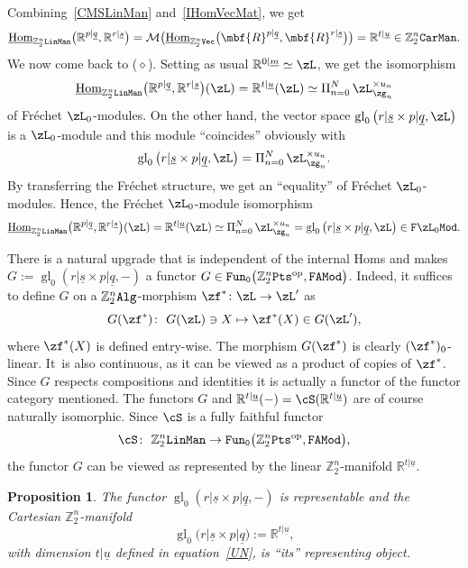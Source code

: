 \documentclass[10pt,a4paper]{amsart}
\newcommand{\op}[1]{\operatorname{#1}}
\newcommand{\R}{{\mathbb R}}
\newcommand{\Z}{{\mathbb Z}}
\def\ul{\underline}
\def\cM{\cal M}
\def\cM{\mathcal{M}}
\def\ul{\underline}
\newcommand{\0}{\otimes}
\newcommand{\z}{\Z_2^n}
\numberwithin{equation}{section}
\newtheorem{Proposition}[Theorem]{Proposition}
 { \theoremstyle{definition}
\newtheorem{Definition}[Theorem]{Definition}
\newtheorem{Example}[Theorem]{Example}
\newtheorem{Remark}[Theorem]{Remark} }
\providecommand{\cal}{\mathcal}
\begin{document}
Combining~\eqref{CMSLinMan} and~\eqref{IHomVecMat}, we get
\begin{gather}\label{IntHomLinManCarMan}
\ul{\op{Hom}}_{\z\tt LinMan}\big(\R^{p|\ul q},\R^{r|\ul s}\big)=\cM\big(\ul{\op{Hom}}_{\z\tt Vec}\big(\mbf{R}^{p|\ul q},\mbf{R}^{r|\ul s}\big)\big)=\R^{t|\ul u}\in\z{\tt CarMan}.
\end{gather}
We now come back to ($\diamond$). Setting as usual $\R^{0|\ul m}\simeq\zL$, we get the isomorphism
\[
\ul{\op{Hom}}_{\z\tt LinMan}\big(\R^{p|\ul q},\R^{r|\ul s}\big)(\zL)=\R^{t|\ul u}(\zL)\simeq \Pi_{n=0}^N\,\zL_{\zg_n}^{\times u_n}
\]
of Fr\'echet $\zL_0$-modules. On the other hand, the vector space $\op{gl}_0\big(r|\ul s\times p|\ul q,\zL\big)$ is a $\zL_0$-module and this module ``coincides'' obviously with
\[
\op{gl}_0\big(r|\ul s\times p|\ul q,\zL\big)=\Pi_{n=0}^N\,\zL_{\zg_n}^{\times u_n}.
\]
By transferring the Fr\'echet structure, we get an ``equality'' of Fr\'echet $\zL_0$-modules. Hence, the Fr\'echet $\zL_0$-module isomorphism
\begin{gather}\label{Man0Mat}
\ul{\op{Hom}}_{\z\tt LinMan}\big(\R^{p|\ul q},\R^{r|\ul s}\big)(\zL)=\R^{t|\ul u}(\zL)\simeq \Pi_{n=0}^N\,\zL_{\zg_n}^{\times u_n}=\op{gl}_0\big(r|\ul s\times p|\ul q,\zL\big)\in{\tt F}\zL_0{\tt Mod}.
\end{gather}

There is a natural upgrade that is independent of the internal Homs and makes $G:=\op{gl}_0(r|\ul s\times p|\ul q,-)$ a functor $G\in{\tt Fun_0}\big(\z{\tt Pts}^{\op{op}},{\tt FAMod}\big)$. Indeed, it suffices to define $G$ on a $\z{\tt Alg}$-morphism $\zf^*\colon \zL\to\zL'$ as
\[
G(\zf^*)\colon\ G(\zL)\ni X\mapsto \zf^*(X)\in G(\zL'),
\]
where $\zf^*(X)$ is defined entry-wise. The morphism $G(\zf^*)$ is clearly $(\zf^*)_0$-linear. It~is also continuous, as it can be viewed as a product of copies of $\zf^*$. Since $G$ respects compositions and identities it is actually a functor of the functor category mentioned. The functors $G$ and $\R^{t|\ul u}(-)=\cS(\R^{t|\ul u})$ are of course naturally isomorphic. Since $\cS$ is a fully faithful functor
\[
\cS\colon\ \z{\tt LinMan}\to{\tt Fun_0}\big(\z{\tt Pts}^{\op{op}},{\tt FAMod}\big),
\]
the functor $G$ can be viewed as represented by the linear $\z$-manifold $\R^{t|\ul u}$.
\begin{Proposition}\label{gl0}
The functor $\op{gl}_0(r|\ul s\times p|\ul q,-)$ is representable and the Cartesian $\z$-manifold
\[
\op{gl}_0\big(r|\ul s\times p|\ul q\big):=\R^{t|\ul u},
\]
with dimension $t|\ul u$ defined in equation~\eqref{UN}, is ``its'' representing object.
\end{Proposition}
\end{document}
